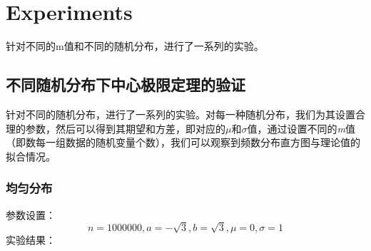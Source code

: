 \documentclass{article}
\begin{document}
\section{Experiments}
针对不同的m值和不同的随机分布，进行了一系列的实验。
\subsection{不同随机分布下中心极限定理的验证}
针对不同的随机分布，进行了一系列的实验。对每一种随机分布，我们为其设置合理的参数，然后可以得到其期望和方差，即对应的$\mu\text{和}\sigma$值，通过设置不同的\textit{m}值（即数每一组数据的随机变量个数），我们可以观察到频数分布直方图与理论值的拟合情况。
\subsubsection{均匀分布}
参数设置：
\[
n=1000000, a = -\sqrt{3}, b = \sqrt{3}, \mu = 0, \sigma = 1
\]
实验结果：
\end{document}
